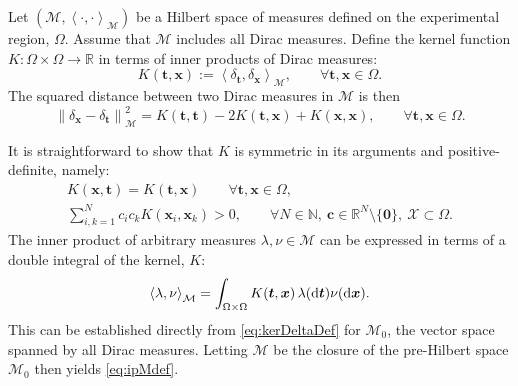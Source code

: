 \documentclass[graybox]{svmult}
\newcommand{\reals}{\mathbb{R}}
\newcommand{\vc}{\boldsymbol{c}}
\newcommand{\vx}{\boldsymbol{x}}
\newcommand{\vt}{\boldsymbol{t}}
\newcommand{\vzero}{\boldsymbol{0}}
\newcommand{\dif}{{\rm d}}
\newcommand{\Xdes}{\mathcal{X}}
\newcommand{\cm}{\mathcal{M}}
\newcommand{\ip}[3][{}]{\ensuremath{\left \langle #2, #3 \right \rangle_{#1}}}
\newcommand{\norm}[2][{}]{\ensuremath{\left \lVert #2 \right \rVert}_{#1}}
\begin{document}
Let $(\cm, \ip[\cm]{\cdot}{\cdot})$ be a Hilbert space of measures defined on the experimental region, $\Omega$.  Assume that $\cm$ includes all Dirac measures.  Define the kernel function $K:\Omega \times \Omega \to \reals$ in terms of inner products of Dirac measures:
\begin{equation} \label{eq:kerDeltaDef}
    K(\vt,\vx) := \ip[\cm]{\delta_{\vt}}{\delta_{\vx}}, \qquad \forall \vt, \vx \in \Omega.
\end{equation}
The squared distance between two Dirac measures in $\cm$ is then
\begin{equation} \label{eq:distDelta}
   \norm[\cm]{\delta_{\vx} - \delta_{\vt}}^2 = K(\vt,\vt) - 2K(\vt,\vx) + K(\vx,\vx), \qquad \forall \vt, \vx \in \Omega.
\end{equation}


It is straightforward to show that $ K$ is symmetric in its arguments and positive-definite, namely:
\begin{subequations} \label{eq:sympd}
\begin{gather}
K(\vx, \vt) = K(\vt, \vx) \qquad \forall \vt, \vx\in \Omega,\\
\sum\limits_{i, k=1}^N c_i c_k  K(\vx_i,\vx_k) > 0, \qquad \forall N\in\mathbb{N}, \  \vc \in\mathbb{R}^N \setminus \{\vzero\},  \ \Xdes \subset \Omega.
\end{gather}
\end{subequations}
The inner product of arbitrary measures $\lambda, \nu \in \cm$ can be expressed in terms of a double integral of the kernel, $K$:
\begin{equation} \label{eq:ipMdef}
    \ip[\cm]{\lambda}{\nu} = \int_{\Omega \times \Omega} K(\vt,\vx) \, \lambda(\dif \vt) \nu(\dif \vx).
\end{equation}
This can be established directly from \eqref{eq:kerDeltaDef} for $\cm_0$, the vector space spanned by all Dirac measures.  Letting $\cm$ be the closure of the pre-Hilbert space $\cm_0$ then yields \eqref{eq:ipMdef}.
\end{document}
